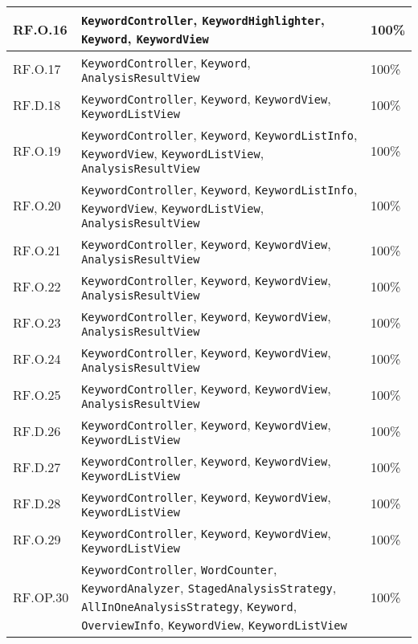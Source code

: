 \begin{tabularx}{\textwidth}{l >{\raggedright\arraybackslash}X l}
  \hline 
  RF.O.16 & \texttt{KeywordController}, \texttt{KeywordHighlighter}, \texttt{Keyword}, \texttt{KeywordView} & 100\% \\
  \hline 
  RF.O.17 & \texttt{KeywordController}, \texttt{Keyword}, \texttt{AnalysisResultView} & 100\% \\
  \hline 
  RF.D.18 & \texttt{KeywordController}, \texttt{Keyword}, \texttt{KeywordView}, \texttt{KeywordListView} & 100\% \\
  \hline 
  RF.O.19 & \texttt{KeywordController}, \texttt{Keyword}, \texttt{KeywordListInfo}, \texttt{KeywordView}, \texttt{KeywordListView}, \texttt{AnalysisResultView} & 100\% \\
  \hline 
  RF.O.20 & \texttt{KeywordController}, \texttt{Keyword}, \texttt{KeywordListInfo}, \texttt{KeywordView}, \texttt{KeywordListView}, \texttt{AnalysisResultView} & 100\% \\
  \hline 
  RF.O.21 & \texttt{KeywordController}, \texttt{Keyword}, \texttt{KeywordView}, \texttt{AnalysisResultView} & 100\% \\
  \hline 
  RF.O.22 & \texttt{KeywordController}, \texttt{Keyword}, \texttt{KeywordView}, \texttt{AnalysisResultView} & 100\% \\
  \hline 
  RF.O.23 & \texttt{KeywordController}, \texttt{Keyword}, \texttt{KeywordView}, \texttt{AnalysisResultView} & 100\% \\
  \hline 
  RF.O.24 & \texttt{KeywordController}, \texttt{Keyword}, \texttt{KeywordView}, \texttt{AnalysisResultView} & 100\% \\
  \hline 
  RF.O.25 & \texttt{KeywordController}, \texttt{Keyword}, \texttt{KeywordView}, \texttt{AnalysisResultView} & 100\% \\
  \hline 
  RF.D.26 & \texttt{KeywordController}, \texttt{Keyword}, \texttt{KeywordView}, \texttt{KeywordListView} & 100\% \\
  \hline 
  RF.D.27 & \texttt{KeywordController}, \texttt{Keyword}, \texttt{KeywordView}, \texttt{KeywordListView} & 100\% \\
  \hline 
  RF.D.28 & \texttt{KeywordController}, \texttt{Keyword}, \texttt{KeywordView}, \texttt{KeywordListView} & 100\% \\
  \hline 
  RF.O.29 & \texttt{KeywordController}, \texttt{Keyword}, \texttt{KeywordView}, \texttt{KeywordListView} & 100\% \\
  \hline 
  RF.OP.30 & \texttt{KeywordController}, \texttt{WordCounter}, \texttt{KeywordAnalyzer}, \texttt{StagedAnalysisStrategy}, \texttt{AllInOneAnalysisStrategy}, \texttt{Keyword}, \texttt{OverviewInfo}, \texttt{KeywordView}, \texttt{KeywordListView} & 100\% \\

\end{tabularx}
